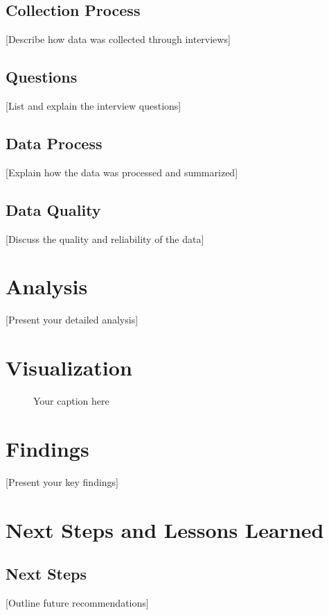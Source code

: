 \documentclass[12pt,a4paper]{article}
\begin{document}
\subsection{Collection Process}
[Describe how data was collected through interviews]

\subsection{Questions}
[List and explain the interview questions]

\subsection{Data Process}
[Explain how the data was processed and summarized]

\subsection{Data Quality}
[Discuss the quality and reliability of the data]

\section{Analysis}
[Present your detailed analysis]

\section{Visualization}
\begin{figure}[H]
    \centering
    \caption{Your caption here}
    \label{fig:your-label}
\end{figure}

\section{Findings}
[Present your key findings]

\section{Next Steps and Lessons Learned}
\subsection{Next Steps}
[Outline future recommendations]
\end{document}
